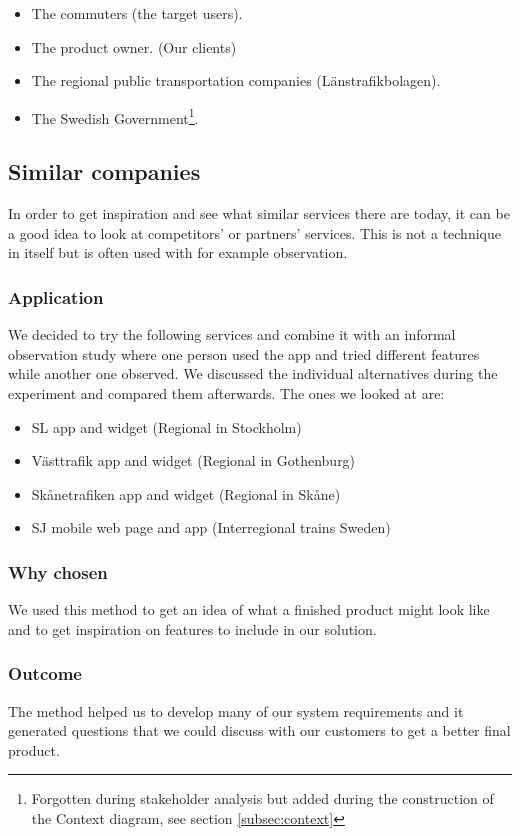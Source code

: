 \documentclass[a4paper]{article}
\begin{document}
		\begin{itemize}
			\item The commuters (the target users).
			\item The product owner. (Our clients)
			\item The regional public transportation companies (Länstrafikbolagen). 
			\item The Swedish Government\footnote{Forgotten during stakeholder analysis but added during the construction of the Context diagram, see section \ref{subsec:context}}.
		\end{itemize}
		
		\subsection{Similar companies}
			In order to get inspiration and see what similar services there are today, it can be a good idea to look at competitors' or partners' services. This is not a technique in itself but is often used with for example observation.
	
		\subsubsection{Application}
			We decided to try the following services and combine it with an informal observation study where one person used the app and tried different features while another one observed. We discussed the individual alternatives during the experiment and compared them afterwards. The ones we looked at are:
			\begin{itemize}
				\item SL app and widget (Regional in Stockholm)
				\item Västtrafik app and widget (Regional in Gothenburg)
				\item Skånetrafiken app and widget (Regional in Skåne)
				\item SJ mobile web page and app (Interregional trains Sweden)
			\end{itemize}
	
		\subsubsection{Why chosen}
		We used this method to get an idea of what a finished product might look like and to get inspiration on features to include in our solution.
		\subsubsection{Outcome}
		The method helped us to develop many of our system requirements and it generated questions that we could discuss with our customers to get a better final product.
\end{document}
